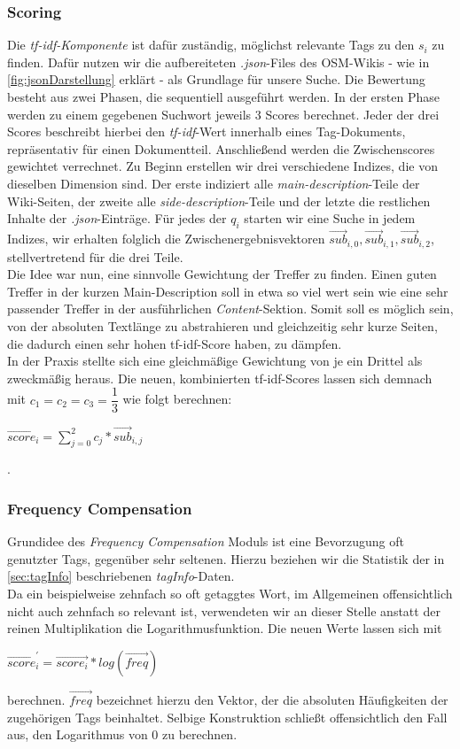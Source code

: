 \documentclass[12pt,pdftex,a4paper]{article}
\begin{document}
\subsubsection{Scoring}\label{sec:scoring}
Die \textit{tf-idf-Komponente} ist dafür zuständig, möglichst relevante Tags zu den $s_i$ zu finden. Dafür nutzen wir die aufbereiteten \textit{.json}-Files des OSM-Wikis -  wie in \autoref{fig:jsonDarstellung} erklärt - als Grundlage für unsere Suche.
Die Bewertung besteht aus zwei Phasen, die sequentiell ausgeführt werden. In der ersten Phase werden zu einem gegebenen Suchwort jeweils 3 Scores berechnet. Jeder der drei Scores beschreibt hierbei den \textit{tf-idf}-Wert innerhalb eines Tag-Dokuments, repräsentativ für einen Dokumentteil.
Anschließend werden die Zwischenscores gewichtet verrechnet.
Zu Beginn erstellen wir drei verschiedene Indizes, die von dieselben Dimension sind. Der erste indiziert alle \textit{main-description}-Teile der Wiki-Seiten, der zweite alle \textit{side-description}-Teile und der letzte die restlichen Inhalte der \textit{.json}-Einträge. 
Für jedes der $q_i$ starten wir eine Suche in jedem Indizes, wir erhalten folglich die Zwischenergebnisvektoren $\vec{sub}_{i,0}, \vec{sub}_{i,1}, \vec{sub}_{i,2}$, stellvertretend für die drei Teile.\\
Die Idee war nun, eine sinnvolle Gewichtung der Treffer zu finden. Einen guten Treffer in der kurzen Main-Description soll in etwa so viel wert sein wie eine sehr passender Treffer in der ausführlichen \textit{Content}-Sektion. Somit soll es möglich sein, von der absoluten Textlänge zu abstrahieren und gleichzeitig sehr kurze Seiten, die dadurch einen sehr hohen tf-idf-Score haben, zu dämpfen.\\
In der Praxis stellte sich eine gleichmäßige Gewichtung von je ein Drittel als zweckmäßig heraus. Die neuen, kombinierten tf-idf-Scores lassen sich demnach mit $c_1 = c_2 = c_3 = \dfrac{1}{3}$ wie folgt berechnen:\\
\begin{center}
	$\vec{score}_{i} = \sum_{j=0}^{2} c_j * \vec{sub}_{i,j}$
\end{center}.

\subsubsection{Frequency Compensation}
Grundidee des \textit{Frequency Compensation} Moduls ist eine Bevorzugung oft genutzter Tags, gegenüber sehr seltenen. Hierzu beziehen wir die Statistik der in \autoref{sec:tagInfo} beschriebenen \textit{tagInfo}-Daten. \\
Da ein beispielweise zehnfach so oft getaggtes Wort, im Allgemeinen offensichtlich nicht auch zehnfach so relevant ist, verwendeten wir an dieser Stelle anstatt der reinen Multiplikation die Logarithmusfunktion. Die neuen Werte lassen sich mit 
\begin{center}
	 $\vec{score}_{i}^{'} = \vec{score_i} * log(\vec{freq})$
\end{center}
berechnen. $\vec{freq}$ bezeichnet hierzu den Vektor, der die absoluten Häufigkeiten der zugehörigen Tags beinhaltet. Selbige Konstruktion schließt offensichtlich den Fall aus, den Logarithmus von 0 zu berechnen.
\end{document}
